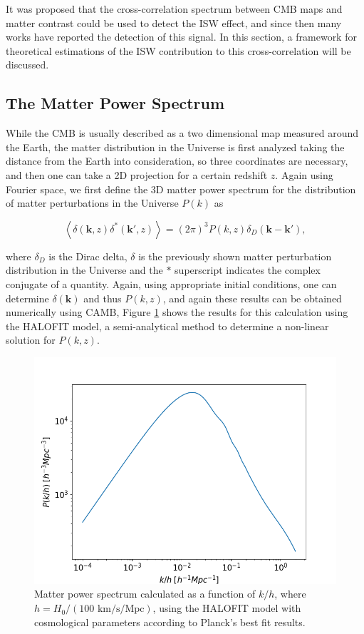 \documentclass[openany,a4paper,12pt,oneside]{book}
\newcommand{\av}[1]{\left\langle #1 \right\rangle} %
\begin{document}
\begin{spacing}{1.5}
It was proposed that the cross-correlation spectrum between CMB maps and matter contrast could be used to detect the ISW effect\cite{Turok96}, and since then many works have reported the detection of this signal\cite{cross_corr:Afshordi, cross_corr:Crittenden2005a, cross_corr:Crittenden2005b, cross_corr:Planck}. In this section, a framework for theoretical estimations of the ISW contribution to this cross-correlation will be discussed.

\subsection{The Matter Power Spectrum}

While the CMB is usually described as a two dimensional map measured around the Earth, the matter distribution in the Universe is first analyzed taking the distance from the Earth into consideration, so three coordinates are necessary, and then one can take a 2D projection for a certain redshift $z$. Again using Fourier space, we first define the 3D matter power spectrum for the distribution of matter perturbations in the Universe $P(k)$ as

\begin{equation}\label{def:P(k)}
    \av{\delta(\mathbf{k}, z) \delta^*(\mathbf{k}', z)}=(2\pi)^3 P(k,z) \delta_D(\mathbf{k}-\mathbf{k}'),
\end{equation}

\noindent where $\delta_D$ is the Dirac delta, $\delta$ is the previously shown matter perturbation distribution in the Universe and the $*$ superscript indicates the complex conjugate of a quantity. Again, using appropriate initial conditions, one can determine $\delta(\mathbf{k})$ and thus $P(k,z)$, and again these results can be obtained numerically using CAMB, Figure \ref{fig:matter_PS} shows the results for this calculation using the HALOFIT model\cite{Halofit2020}, a semi-analytical method to determine a non-linear solution for $P(k,z)$.  

\begin{figure}[!htb]
    \centering
    \includegraphics[width=.75\linewidth]{Imagens/Pk_3dmatter_LCDM.png}
    \caption{Matter power spectrum calculated as a function of $k/h$, where $h=H_0/(100\text{ km/s/Mpc})$, using the HALOFIT model with cosmological parameters according to Planck's best fit results\cite{Planck_results}.}
    \label{fig:matter_PS}
\end{figure}


\end{spacing}
\end{document}
